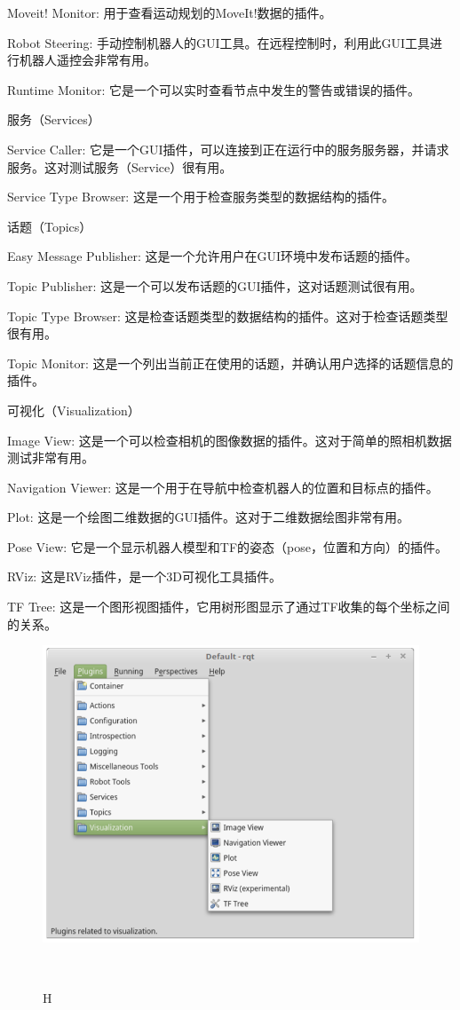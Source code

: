 \documentclass[geye,green,kindle,cn]{elegantnote}
\begin{document}
Moveit! Monitor: 用于查看运动规划的MoveIt!数据的插件。

Robot Steering: 手动控制机器人的GUI工具。在远程控制时，利用此GUI工具进行机器人遥控会非常有用。

Runtime Monitor: 它是一个可以实时查看节点中发生的警告或错误的插件。

服务（Services）

Service Caller: 它是一个GUI插件，可以连接到正在运行中的服务服务器，并请求服务。这对测试服务（Service）很有用。

Service Type Browser: 这是一个用于检查服务类型的数据结构的插件。

话题（Topics）

Easy Message Publisher: 这是一个允许用户在GUI环境中发布话题的插件。

Topic Publisher: 这是一个可以发布话题的GUI插件，这对话题测试很有用。

Topic Type Browser: 这是检查话题类型的数据结构的插件。这对于检查话题类型很有用。

Topic Monitor: 这是一个列出当前正在使用的话题，并确认用户选择的话题信息的插件。

可视化（Visualization）

Image View: 这是一个可以检查相机的图像数据的插件。这对于简单的照相机数据测试非常有用。

Navigation Viewer: 这是一个用于在导航中检查机器人的位置和目标点的插件。

Plot: 这是一个绘图二维数据的GUI插件。这对于二维数据绘图非常有用。

Pose View: 它是一个显示机器人模型和TF的姿态（pose，位置和方向）的插件。

RViz: 这是RViz插件，是一个3D可视化工具插件。

TF Tree: 这是一个图形视图插件，它用树形图显示了通过TF收集的每个坐标之间的关系。

\begin{figure}[htbp]
    \centering
    \includegraphics[width=1\linewidth]{src/H.png}
    \centering
    \caption{H} \label{picture:H}
\end{figure}
\end{document}
